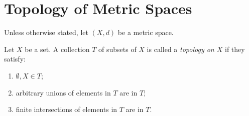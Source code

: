 \section{Topology of Metric Spaces}\label{sec:top-of-metric-spaces}
    Unless otherwise stated, let $(X,d)$ be a metric space.
    \begin{definition}
        Let $X$ be a set. A collection $T$ of subsets of $X$ is called a \textit{topology on $X$} if they satisfy:
            \begin{enumerate}[label = (\arabic*),itemsep=1pt,topsep=3pt]
                \item $\emptyset,X \in T$;
                \item arbitrary unions of elements in $T$ are in $T$;
                \item finite intersections of elements in $T$ are in $T$.
            \end{enumerate}
    \end{definition}

